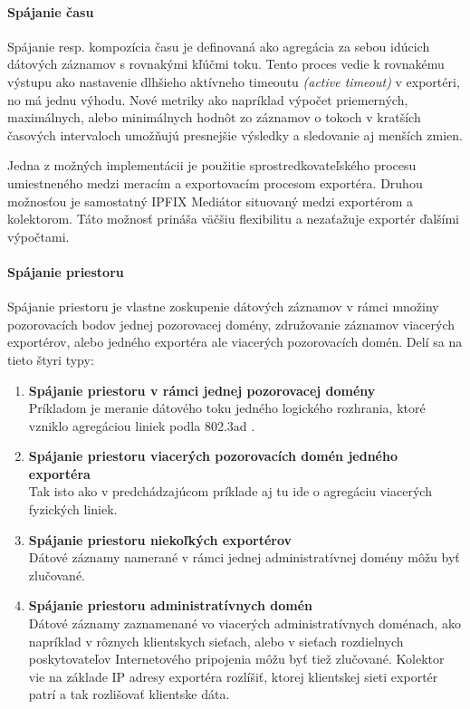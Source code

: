 \paragraph{Spájanie času}

Spájanie resp. kompozícia času je definovaná ako agregácia za sebou idúcich dátových záznamov s rovnakými
kľúčmi toku. Tento proces vedie k rovnakému výstupu ako nastavenie dlhšieho aktívneho timeoutu
\emph{(active timeout)} v exportéri, no má jednu výhodu. Nové metriky ako napríklad výpočet priemerných, 
maximálnych, alebo minimálnych hodnôt zo záznamov o tokoch v kratších časových intervaloch umožňujú 
presnejšie výsledky a sledovanie aj menších zmien.

Jedna z možných implementácii je použitie sprostredkovateľského procesu umiestneného medzi 
meracím a exportovacím procesom exportéra. Druhou možnosťou je samostatný IPFIX Mediátor situovaný medzi
exportérom a kolektorom. Táto možnosť prináša väčšiu flexibilitu a nezaťažuje exportér ďalšími výpočtami.


\paragraph{Spájanie priestoru} \label{sec:spatial}

Spájanie priestoru je vlastne zoskupenie dátových záznamov v rámci množiny pozorovacích bodov jednej 
pozorovacej domény, združovanie záznamov viacerých exportérov, alebo jedného exportéra ale viacerých 
pozorovacích domén. Delí sa na tieto štyri typy:

\begin{enumerate}
 \item \textbf{Spájanie priestoru v rámci jednej pozorovacej domény} \\ 
    Príkladom je meranie dátového toku jedného logického rozhrania, ktoré vzniklo agregáciou liniek 
    podla 802.3ad \citep{ieee802.3}.
 \item \textbf{Spájanie priestoru viacerých pozorovacích domén jedného exportéra} \\
    Tak isto ako v predchádzajúcom príklade aj tu ide o agregáciu viacerých fyzických liniek. 
 \item \textbf{Spájanie priestoru niekoľkých exportérov} \\
    Dátové záznamy namerané v rámci jednej administratívnej domény môžu byť zlučované.
 \item \textbf{Spájanie priestoru administratívnych domén} \\
    Dátové záznamy zaznamenané vo viacerých administratívnych doménach, ako napríklad v rôznych klientskych 
    sieťach, alebo v sieťach rozdielnych poskytovateľov Internetového pripojenia môžu byť tiež zlučované.
    Kolektor vie na základe IP adresy exportéra rozlíšiť, ktorej klientskej sieti exportér patrí a tak 
    rozlišovať klientske dáta.
\end{enumerate}


